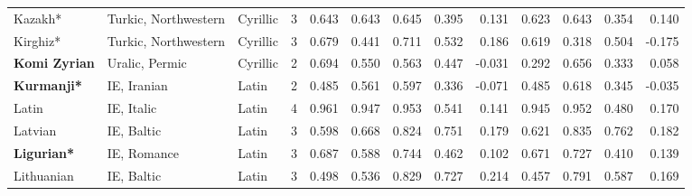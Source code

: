 \begin{tabular}{lllrrrrrrrrrr}
                Kazakh* &            Turkic, Northwestern &   Cyrillic &         3 &                       0.643 &                         0.643 &         0.645 &                  0.395 &            0.131 &                         0.623 &         0.643 &                  0.354 &            0.140 \\
               Kirghiz* &            Turkic, Northwestern &   Cyrillic &         3 &                       0.679 &                         0.441 &         0.711 &                  0.532 &            0.186 &                         0.619 &         0.318 &                  0.504 &           -0.175 \\
   \textbf{Komi Zyrian} &                  Uralic, Permic &   Cyrillic &         2 &                       0.694 &                         0.550 &         0.563 &                  0.447 &           -0.031 &                         0.292 &         0.656 &                  0.333 &            0.058 \\
     \textbf{Kurmanji*} &                     IE, Iranian &      Latin &         2 &                       0.485 &                         0.561 &         0.597 &                  0.336 &           -0.071 &                         0.485 &         0.618 &                  0.345 &           -0.035 \\
                  Latin &                      IE, Italic &      Latin &         4 &                       0.961 &                         0.947 &         0.953 &                  0.541 &            0.141 &                         0.945 &         0.952 &                  0.480 &            0.170 \\
                Latvian &                      IE, Baltic &      Latin &         3 &                       0.598 &                         0.668 &         0.824 &                  0.751 &            0.179 &                         0.621 &         0.835 &                  0.762 &            0.182 \\
     \textbf{Ligurian*} &                     IE, Romance &      Latin &         3 &                       0.687 &                         0.588 &         0.744 &                  0.462 &            0.102 &                         0.671 &         0.727 &                  0.410 &            0.139 \\
             Lithuanian &                      IE, Baltic &      Latin &         3 &                       0.498 &                         0.536 &         0.829 &                  0.727 &            0.214 &                         0.457 &         0.791 &                  0.587 &            0.169 \\

\end{tabular}
